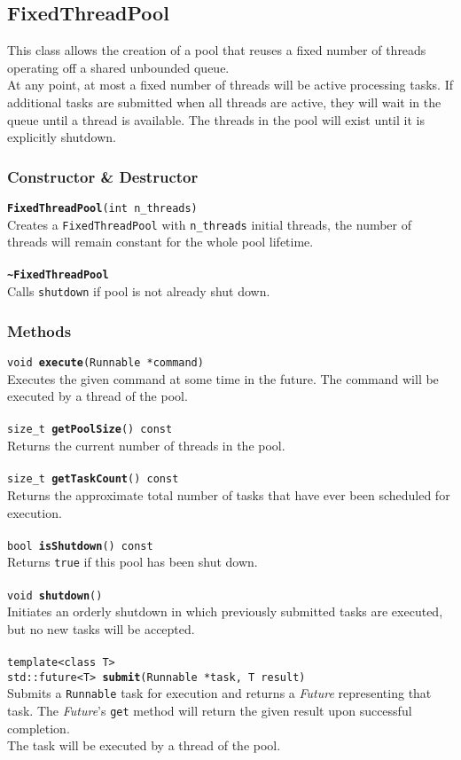 \documentclass[10pt,twocolumn,letterpaper]{article}
\begin{document}
	\subsection{FixedThreadPool}\label{sec:ftp}
	\noindent
	This class allows the creation of a pool that reuses a fixed number of threads operating off a shared unbounded queue.\\
	At any point, at most a fixed number of threads will be active processing tasks.
	If additional tasks are submitted when all threads are active, they will wait in the queue until a thread is available.
	The threads in the pool will exist until it is explicitly shutdown.
	\subsubsection{Constructor \& Destructor}
	\texttt{\textbf{FixedThreadPool}(int n\_threads)}\\
	Creates a \lstinline|FixedThreadPool| with \lstinline|n_threads| initial threads, the number of threads will remain constant for the whole pool lifetime.\\\\
	\texttt{\textbf{\textasciitilde FixedThreadPool}}\\
	Calls \texttt{shutdown} if pool is not already shut down.
	\subsubsection{Methods}
	\texttt{void \textbf{execute}(Runnable *command)}\\
	Executes the given command at some time in the future. The command will be executed by a thread of the pool.\\\\
	\texttt{size\_t \textbf{getPoolSize}() const}\\
	Returns the current number of threads in the pool.\\\\
	\texttt{size\_t \textbf{getTaskCount}() const}\\
	Returns the approximate total number of tasks that have ever been scheduled for execution.\\\\
	\texttt{bool \textbf{isShutdown}() const}\\
	Returns \texttt{true} if this pool has been shut down.\\\\
	\texttt{void \textbf{shutdown}()}\\
	Initiates an orderly shutdown in which previously submitted tasks are executed, but no new tasks will be accepted.\\\\
	\texttt{template<class T>\\
		std::future<T> \textbf{submit}(Runnable *task, T result)}\\
	Submits a \lstinline|Runnable| task for execution and returns a \textit{Future} representing that task. The \textit{Future}'s \lstinline|get| method will return the given result upon successful completion.\\
	The task will be executed by a thread of the pool.
	
\end{document}
